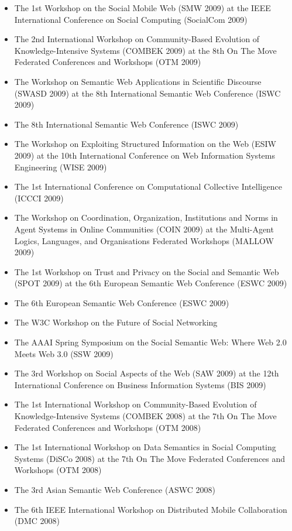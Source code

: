 \documentclass[10pt,a4paper]{res} %
\begin{document}
\begin{resume}
\begin{itemize}
\item The 1st Workshop on the Social Mobile Web (SMW 2009) at the IEEE International Conference on Social Computing (SocialCom 2009)
\item The 2nd International Workshop on Community-Based Evolution of Knowledge-Intensive Systems (COMBEK 2009) at the 8th On The Move Federated Conferences and Workshops (OTM 2009)
\item The Workshop on Semantic Web Applications in Scientific Discourse (SWASD 2009) at the 8th International Semantic Web Conference (ISWC 2009)
\item The 8th International Semantic Web Conference (ISWC 2009)
\item The Workshop on Exploiting Structured Information on the Web (ESIW 2009) at the 10th International Conference on Web Information Systems Engineering (WISE 2009)
\item The 1st International Conference on Computational Collective Intelligence (ICCCI 2009)
\item The Workshop on Coordination, Organization, Institutions and Norms in Agent Systems in Online Communities (COIN 2009) at the Multi-Agent Logics, Languages, and Organisations Federated Workshops (MALLOW 2009)
\item The 1st Workshop on Trust and Privacy on the Social and Semantic Web (SPOT 2009) at the 6th European Semantic Web Conference (ESWC 2009)
\item The 6th European Semantic Web Conference (ESWC 2009)
\item The W3C Workshop on the Future of Social Networking
\item The AAAI Spring Symposium on the Social Semantic Web: Where Web 2.0 Meets Web 3.0 (SSW 2009)
\item The 3rd Workshop on Social Aspects of the Web (SAW 2009) at the 12th International Conference on Business Information Systems (BIS 2009)
\item The 1st International Workshop on Community-Based Evolution of Knowledge-Intensive Systems (COMBEK 2008) at the 7th On The Move Federated Conferences and Workshops (OTM 2008)
\item The 1st International Workshop on Data Semantics in Social Computing Systems (DiSCo 2008) at the 7th On The Move Federated Conferences and Workshops (OTM 2008)
\item The 3rd Asian Semantic Web Conference (ASWC 2008)
\item The 6th IEEE International Workshop on Distributed Mobile Collaboration (DMC 2008)

\end{itemize}
\end{resume}
\end{document}
